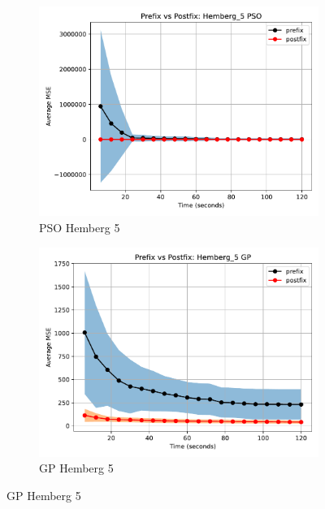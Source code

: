 \documentclass[12pt]{iopart}
\begin{document}
\begin{figure}
    \vspace{0.5cm}
    
    \begin{subfigure}[b]{0.4\textwidth}
        \includegraphics[width=\linewidth, keepaspectratio]{Hemberg_Benchmarks/PrePostHemberg_5PSO.pdf}
        \caption{PSO Hemberg 5}
        \label{subfig:hemberg_5_PSO}
    \end{subfigure}
    \begin{subfigure}[b]{0.4\textwidth}
        \includegraphics[width=\linewidth, keepaspectratio]{Hemberg_Benchmarks/PrePostHemberg_5GP.pdf}
        \caption{GP Hemberg 5}
        \label{subfig:hemberg_5_GP}
    \end{subfigure}
    

\end{figure}
\end{document}

